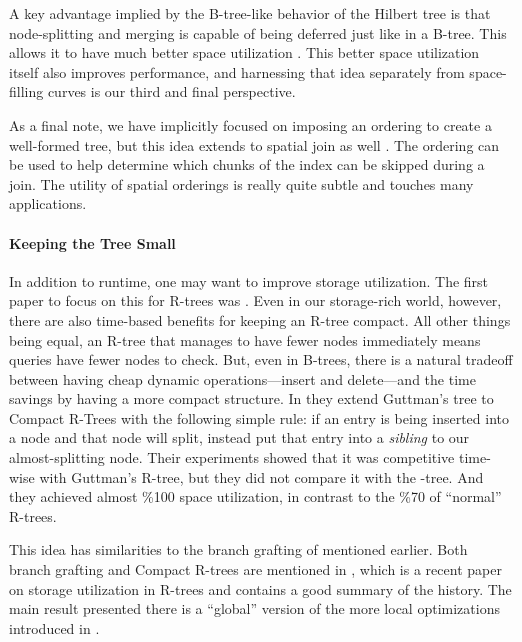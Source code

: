 A key advantage implied by the B-tree-like behavior of the Hilbert tree is that node-splitting and merging is capable of being deferred just like in a B-tree.
This allows it to have much better space utilization \cite{kamelfaloutsos94}.
This better space utilization itself also improves performance, and harnessing that idea separately from space-filling curves is our third and final perspective.

As a final note, we have implicitly focused on imposing an ordering to create a well-formed tree, but this idea extends to spatial join as well \cite{jacoxsamet07}.
The ordering can be used to help determine which chunks of the index can be skipped during a join.
The utility of spatial orderings is really quite subtle and touches many applications.

\paragraph{Keeping the Tree Small}
In addition to runtime, one may want to improve storage utilization.
The first paper to focus on this for R-trees was \cite{huanglinlin01}.
Even in our storage-rich world, however, there are also time-based benefits for keeping an R-tree compact.
All other things being equal, an R-tree that manages to have fewer nodes immediately means queries have fewer nodes to check.
But, even in B-trees, there is a natural tradeoff between having cheap dynamic operations---insert and delete---and the time savings by having a more compact structure.
In \cite{huanglinlin01} they extend Guttman's tree to Compact R-Trees with the following simple rule: if an entry is being inserted into a node and that node will split, instead put that entry into a \emph{sibling} to our almost-splitting node.
Their experiments showed that it was competitive time-wise with Guttman's R-tree, but they did not compare it with the \rstar-tree.
And they achieved almost \%100 space utilization, in contrast to the \%70 of ``normal'' R-trees.

This idea has similarities to the branch grafting of \cite{schrekchen00} mentioned earlier.
Both branch grafting and Compact R-trees are mentioned in \cite{zhanglucheng06}, which is a recent paper on storage utilization in R-trees and contains a good summary of the history.
The main result presented there is a ``global'' version of the more local optimizations introduced in \cite{huanglinlin01}.
